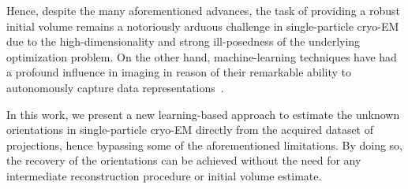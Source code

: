 Hence, despite the many aforementioned advances, the task of providing a robust initial volume remains a notoriously arduous challenge in single-particle cryo-EM due to the high-dimensionality and strong ill-posedness of the underlying optimization problem.
On the other hand, machine-learning techniques have had a profound influence in imaging in reason of their remarkable ability to autonomously capture data representations~\cite{lecun2015deep}. 

In this work, we present a new learning-based approach to estimate the unknown orientations in single-particle cryo-EM directly from the acquired dataset of projections, hence bypassing some of the aforementioned limitations.
By doing so, the recovery of the orientations can be achieved without the need for any intermediate reconstruction procedure or initial volume estimate. %

